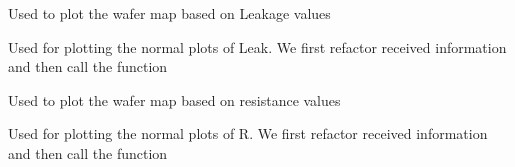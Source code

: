 \documentclass[letterpaper,10pt,english]{sphinxmanual}
\begin{document}

\begin{fulllineitems}
\label{\detokenize{app:app.Leak_WM}}
\pysigstartsignatures
{}
\pysigstopsignatures
\sphinxAtStartPar
Used to plot the wafer map based on Leakage values

\end{fulllineitems}


\begin{fulllineitems}
\label{\detokenize{app:app.Leak_normal}}
\pysigstartsignatures
{}
\pysigstopsignatures
\sphinxAtStartPar
Used for plotting the normal plots of Leak.
We first refactor received information and then call the function

\end{fulllineitems}


\begin{fulllineitems}
\label{\detokenize{app:app.R_WM}}
\pysigstartsignatures
{}
\pysigstopsignatures
\sphinxAtStartPar
Used to plot the wafer map based on resistance values

\end{fulllineitems}


\begin{fulllineitems}
\label{\detokenize{app:app.R_normal}}
\pysigstartsignatures
{}
\pysigstopsignatures
\sphinxAtStartPar
Used for plotting the normal plots of R.
We first refactor received information and then call the function

\end{fulllineitems}
\end{document}
